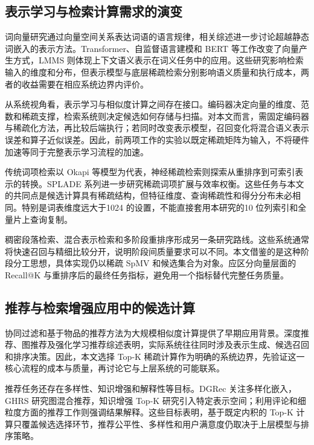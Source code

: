 \subsection{表示学习与检索计算需求的演变}
词向量研究通过向量空间关系表达词语的语言规律\cite{mikolov2013linguistic}，相关综述进一步讨论超越静态词嵌入的表示方法\cite{incitti2023beyond}。Transformer、自监督语言建模和 BERT 等工作改变了向量产生方式\cite{vaswani2017attention,radford2018improving,devlin2018bert}，LMMS 则体现上下文语义表示在词义任务中的应用\cite{loureiro2022lmms}。这些研究影响检索输入的维度和分布，但表示模型与底层稀疏检索分别影响语义质量和执行成本，两者的收益需要在相应系统边界内评价。

从系统视角看，表示学习与相似度计算之间存在接口。编码器决定向量的维度、范数和稀疏支撑，检索系统则决定候选如何存储与扫描。对本文而言，需固定编码器与稀疏化方法，再比较后端执行；若同时改变表示模型，召回变化将混合语义表示误差和算子近似误差。因此，前两项工作的实验以既定稀疏矩阵为输入，不将硬件加速等同于完整表示学习流程的加速。

传统词项检索以 Okapi 等模型为代表\cite{1995BM25}，神经稀疏检索则探索从重排序到可索引表示的转换\cite{zamani2018neural,bai2020sparterm}。SPLADE 系列进一步研究稀疏词项扩展与效率权衡\cite{formal2021splade_v2,formal2024towards}。这些任务与本文的共同点是候选计算具有稀疏结构，但特征维度、查询稀疏性和得分分布未必相同。特别是词表维度远大于1024 的设置，不能直接套用本研究的10 位列索引和全量片上查询复制。

稠密段落检索、混合表示检索和多阶段重排序形成另一条研究路线\cite{karpukhin2020dense,chuang2024information,xu2023hybrid,sasazawa2023text}。这些系统通常将快速召回与精细比较分开，说明阶段间质量要求可以不同。本文借鉴的是这种阶段分工思想，具体实现仍以稀疏 SpMV 和候选集合为对象。应区分向量层面的 Recall@K 与重排序后的最终任务指标，避免用一个指标替代完整任务质量。

\subsection{推荐与检索增强应用中的候选计算}
协同过滤和基于物品的推荐方法为大规模相似度计算提供了早期应用背景\cite{goldberg1992using,sarwar2001item}。深度推荐、图推荐及强化学习推荐综述表明，实际系统往往同时涉及表示生成、候选召回和排序决策\cite{chen2020survey,zhang2021artificial,wang2021graph,afsar2022reinforcement}。因此，本文选择 Top-K 稀疏计算作为明确的系统边界，先验证这一核心流程的成本与质量，再讨论它与上层系统的可能联系。

推荐任务还存在多样性、知识增强和解释性等目标。DGRec 关注多样化嵌入，GHRS 研究图混合推荐，知识增强 Top-K 研究引入特定表示空间\cite{yang2023dgrec,darban2022ghrs,ma2021knowledge}；利用评论和细粒度方面的推荐工作则强调结果解释\cite{Amazon_Product_Reviews_2019}。这些目标表明，基于既定内积的 Top-K 计算只覆盖候选选择环节，推荐公平性、多样性和用户满意度仍取决于上层模型与排序策略。

